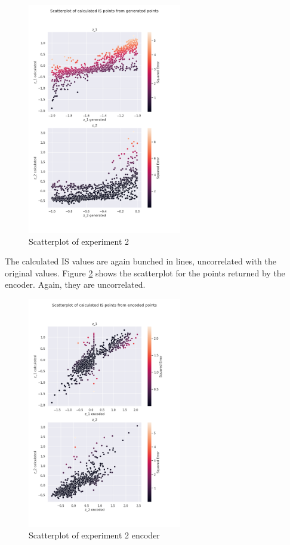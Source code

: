 \begin{figure}[H]
    \centering
    \includegraphics[width=0.6\textwidth]{Cap5/scatterplot2}
    \caption{Scatterplot of experiment 2}
    \label{fig:scatter_exp2}
\end{figure}

The calculated IS values are again bunched in lines, uncorrelated with the original values. Figure \ref{fig:scatter_enc_exp2} shows the scatterplot for the points returned by the encoder. Again, they are uncorrelated.

\begin{figure}[H]
    \centering
    \includegraphics[width=0.6\textwidth]{Cap5/scatterplot_enc2}
    \caption{Scatterplot of experiment 2 encoder}
    \label{fig:scatter_enc_exp2}
\end{figure}

